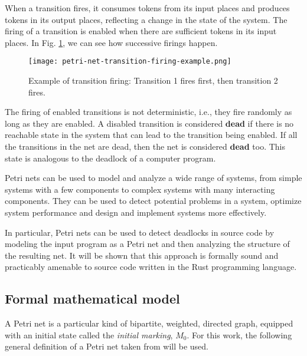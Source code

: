 When a transition fires, it consumes tokens from its input places and
produces tokens in its output places, reflecting a change in the state of the system.
The firing of a transition is enabled when there are sufficient tokens in its input places.
In Fig. \ref{fig:petri-net-transition-firing-example}, we can see how successive firings happen.

\begin{figure}[H]
    \centering
    \texttt{[image: petri-net-transition-firing-example.png]}
    \caption{Example of transition firing: Transition 1 fires first, then transition 2 fires.}
    \label{fig:petri-net-transition-firing-example}
\end{figure}

The firing of enabled transitions is not deterministic, i.e., they fire randomly as long as they are enabled.
A disabled transition is considered \textbf{dead}
if there is no reachable state in the system that can lead to the transition being enabled.
If all the transitions in the net are dead, then the net is considered \textbf{dead} too.
This state is analogous to the deadlock of a computer program.

Petri nets can be used to model and analyze a wide range of systems,
from simple systems with a few components to complex systems with many interacting components.
They can be used to detect potential problems in a system,
optimize system performance and design and implement systems more effectively.

In particular, Petri nets can be used to detect deadlocks in source code by modeling the input program as a Petri net
and then analyzing the structure of the resulting net.
It will be shown that this approach is formally sound and
practicably amenable to source code written in the Rust programming language.

\subsection{Formal mathematical model}

A Petri net is a particular kind of bipartite, weighted, directed graph,
equipped with an initial state called the \textit{initial marking}, $M_{0}$.
For this work, the following general definition of a Petri net taken from \cite{murata1989} will be used.

